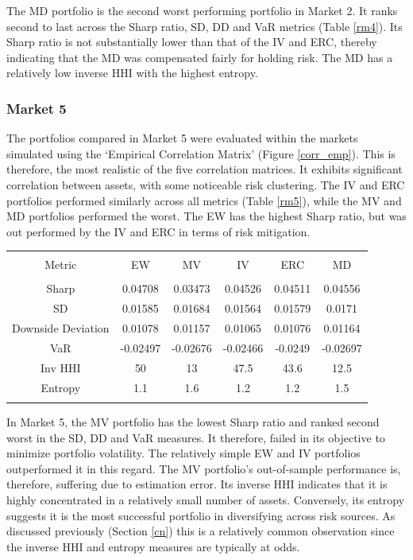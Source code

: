 \documentclass[11pt,preprint, authoryear]{elsarticle}
\let\origtable\table
\let\endorigtable\endtable
\renewenvironment{table}[1][2] {
    \expandafter\origtable\expandafter[H]
} {
    \endorigtable
}
\numberwithin{equation}{section}
\numberwithin{figure}{section}
\numberwithin{table}{section}
\begin{document}
The MD portfolio is the second worst performing portfolio in Market 2.
It ranks second to last across the Sharp ratio, SD, DD and VaR metrics
(Table \ref{rm4}). Its Sharp ratio is not substantially lower than that
of the IV and ERC, thereby indicating that the MD was compensated fairly
for holding risk. The MD has a relatively low inverse HHI with the
highest entropy.

\hypertarget{market-5}{%
\subsubsection{Market 5}\label{market-5}}

The portfolios compared in Market 5 were evaluated within the markets
simulated using the `Empirical Correlation Matrix' (Figure
\ref{corr_emp}). This is therefore, the most realistic of the five
correlation matrices. It exhibits significant correlation between
assets, with some noticeable risk clustering. The IV and ERC portfolios
performed similarly across all metrics (Table \ref{rm5}), while the MV
and MD portfolios performed the worst. The EW has the highest Sharp
ratio, but was out performed by the IV and ERC in terms of risk
mitigation.

\begin{table}[!htbp] \centering 
  \caption{Market 5 - Portfolio Risk Metrics} 
  \label{rm5} 
\begin{tabular}{@{\extracolsep{5pt}} cccccc} 
\\[-1.8ex]\hline 
\hline \\[-1.8ex] 
Metric & EW & MV & IV & ERC & MD \\ 
\hline \\[-1.8ex] 
Sharp & 0.04708 & 0.03473 & 0.04526 & 0.04511 & 0.04556 \\ 
SD & 0.01585 & 0.01684 & 0.01564 & 0.01579 & 0.0171 \\ 
Downside Deviation & 0.01078 & 0.01157 & 0.01065 & 0.01076 & 0.01164 \\ 
VaR & -0.02497 & -0.02676 & -0.02466 & -0.0249 & -0.02697 \\ 
Inv HHI & 50 & 13 & 47.5 & 43.6 & 12.5 \\ 
Entropy & 1.1 & 1.6 & 1.2 & 1.2 & 1.5 \\ 
\hline \\[-1.8ex] 
\end{tabular} 
\end{table}

In Market 5, the MV portfolio has the lowest Sharp ratio and ranked
second worst in the SD, DD and VaR measures. It therefore, failed in its
objective to minimize portfolio volatility. The relatively simple EW and
IV portfolios outperformed it in this regard. The MV portfolio's
out-of-sample performance is, therefore, suffering due to estimation
error. Its inverse HHI indicates that it is highly concentrated in a
relatively small number of assets. Conversely, its entropy suggests it
is the most successful portfolio in diversifying across risk sources. As
discussed previously (Section \ref{cn}) this is a relatively common
observation since the inverse HHI and entropy measures are typically at
odds.
\end{document}
